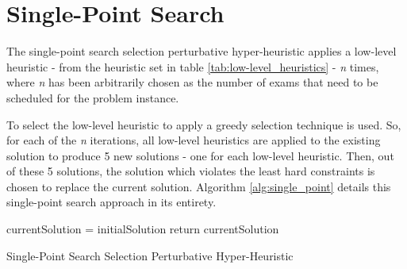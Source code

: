 \section{Single-Point Search}\label{sec:single_point}
The single-point search selection perturbative hyper-heuristic applies a low-level heuristic - from the heuristic set in table \ref{tab:low-level_heuristics} - \emph{n} times, where \emph{n} has been arbitrarily chosen as the number of exams that need to be scheduled for the problem instance.

To select the low-level heuristic to apply a greedy selection technique is used. So, for each of the \emph{n} iterations, all low-level heuristics are applied to the existing solution to produce 5 new solutions - one for each low-level heuristic. Then, out of these 5 solutions, the solution which violates the least hard constraints is chosen to replace the current solution. Algorithm \ref{alg:single_point} details this single-point search approach in its entirety.

\begin{algorithm}[H]\label{alg:single_point}
\SetAlgoLined
 currentSolution = initialSolution\;
 \BlankLine
 \BlankLine
 return currentSolution\;
 \caption{Single-Point Search Selection Perturbative Hyper-Heuristic}
\end{algorithm}